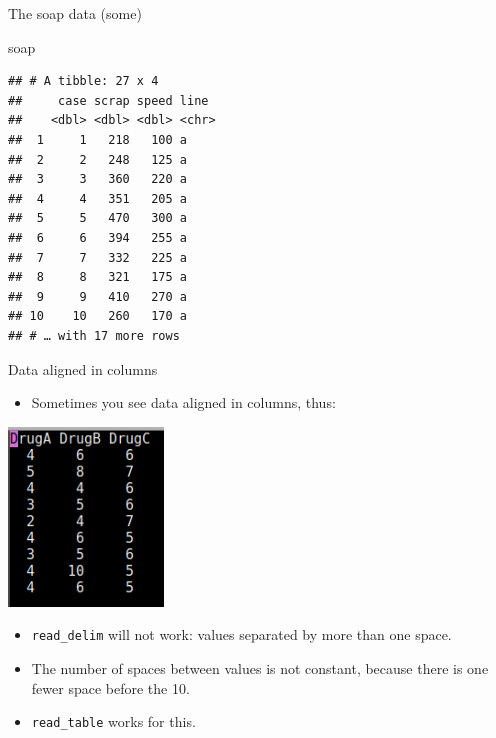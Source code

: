 \documentclass[ignorenonframetext,]{beamer}
\newenvironment{Shaded}{\begin{snugshade}}{\end{snugshade}}
\newcommand{\NormalTok}[1]{#1}
\providecommand{\tightlist}{%
  \setlength{\itemsep}{0pt}\setlength{\parskip}{0pt}}
\begin{document}
\begin{frame}[fragile]{The soap data (some)}
\protect\hypertarget{the-soap-data-some}{}

\begin{Shaded}
\begin{Highlighting}[]
\NormalTok{soap}
\end{Highlighting}
\end{Shaded}

\begin{verbatim}
## # A tibble: 27 x 4
##     case scrap speed line 
##    <dbl> <dbl> <dbl> <chr>
##  1     1   218   100 a    
##  2     2   248   125 a    
##  3     3   360   220 a    
##  4     4   351   205 a    
##  5     5   470   300 a    
##  6     6   394   255 a    
##  7     7   332   225 a    
##  8     8   321   175 a    
##  9     9   410   270 a    
## 10    10   260   170 a    
## # … with 17 more rows
\end{verbatim}

\end{frame}

\begin{frame}[fragile]{Data aligned in columns}
\protect\hypertarget{data-aligned-in-columns}{}

\begin{itemize}
\tightlist
\item
  Sometimes you see data aligned in columns, thus:
\end{itemize}

\includegraphics[width=\textwidth,height=1.875in]{Screenshot_2019-04-24_20-16-24.png}

\begin{itemize}
\tightlist
\item
  \texttt{read\_delim} will not work: values separated by more than one
  space.
\item
  The number of spaces between values is not constant, because there is
  one fewer space before the 10.
\item
  \texttt{read\_table} works for this.
\end{itemize}

\end{frame}
\end{document}
